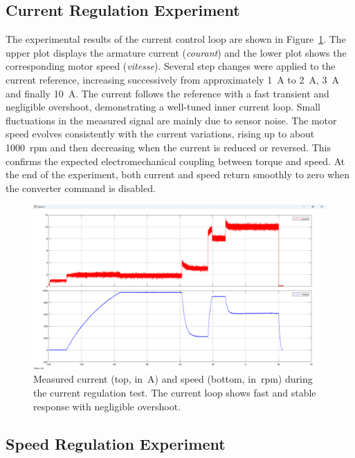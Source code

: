 \documentclass{rapportCS}
\begin{document}
\subsection{Current Regulation Experiment}

The experimental results of the current control loop are shown in Figure~\ref{fig:exp_I_20A}. 
The upper plot displays the armature current (\textit{courant}) and the lower plot shows the corresponding motor speed (\textit{vitesse}). 
Several step changes were applied to the current reference, increasing successively from approximately 1~A to 2~A, 3~A and finally 10~A. 
The current follows the reference with a fast transient and negligible overshoot, demonstrating a well-tuned inner current loop. 
Small fluctuations in the measured signal are mainly due to sensor noise. 
The motor speed evolves consistently with the current variations, rising up to about 1000~rpm and then decreasing when the current is reduced or reversed. 
This confirms the expected electromechanical coupling between torque and speed. 
At the end of the experiment, both current and speed return smoothly to zero when the converter command is disabled.

\begin{figure}[H]
    \centering
    \includegraphics[width=\linewidth, keepaspectratio]{figures/PP1.png}
    \caption{Measured current (top, in~A) and speed (bottom, in~rpm) during the current regulation test. 
    The current loop shows fast and stable response with negligible overshoot.}
    \label{fig:exp_I_20A}
\end{figure}


\subsection{Speed Regulation Experiment}
\end{document}
